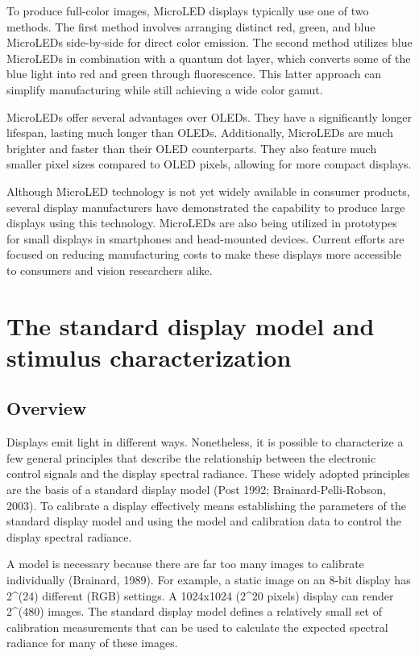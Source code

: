 \documentclass[
  letterpaper,
]{book}
\begin{document}
To produce full-color images, MicroLED displays typically use one of two
methods. The first method involves arranging distinct red, green, and
blue MicroLEDs side-by-side for direct color emission. The second method
utilizes blue MicroLEDs in combination with a quantum dot layer, which
converts some of the blue light into red and green through fluorescence.
This latter approach can simplify manufacturing while still achieving a
wide color gamut.

MicroLEDs offer several advantages over OLEDs. They have a significantly
longer lifespan, lasting much longer than OLEDs. Additionally, MicroLEDs
are much brighter and faster than their OLED counterparts. They also
feature much smaller pixel sizes compared to OLED pixels, allowing for
more compact displays.

Although MicroLED technology is not yet widely available in consumer
products, several display manufacturers have demonstrated the capability
to produce large displays using this technology. MicroLEDs are also
being utilized in prototypes for small displays in smartphones and
head-mounted devices. Current efforts are focused on reducing
manufacturing costs to make these displays more accessible to consumers
and vision researchers alike.

\section{The standard display model and stimulus
characterization}\label{the-standard-display-model-and-stimulus-characterization}

\subsection{\texorpdfstring{\textbf{Overview}}{Overview}}\label{overview}

Displays emit light in different ways. Nonetheless, it is possible to
characterize a few general principles that describe the relationship
between the electronic control signals and the display spectral
radiance. These widely adopted principles are the basis of a standard
display model (Post 1992; Brainard-Pelli-Robson, 2003). To calibrate a
display effectively means establishing the parameters of the standard
display model and using the model and calibration data to control the
display spectral radiance.

A model is necessary because there are far too many images to calibrate
individually (Brainard, 1989). For example, a static image on an 8-bit
display has 2\^{}(24) different (RGB) settings. A 1024x1024 (2\^{}20
pixels) display can render 2\^{}(480) images. The standard display model
defines a relatively small set of calibration measurements that can be
used to calculate the expected spectral radiance for many of these
images.
\end{document}

